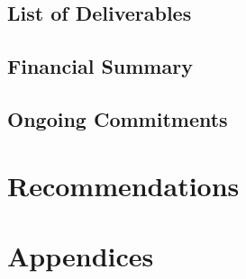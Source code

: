 \documentclass[amsmath, amssymb, aps, pra, 12pt]{revtex4-1}
\begin{document}
\subsection{\label{sec:projectdeliverables:listofdeliverables}List of Deliverables}


\subsection{\label{sec:projectdeliverables:financialsummary}Financial Summary}


\subsection{\label{sec:projectdeliverables:ongoingcommitments}Ongoing Commitments}



\section{\label{sec:recommendations}Recommendations}


\section{\label{sec:appendices}Appendices}



\end{document}
